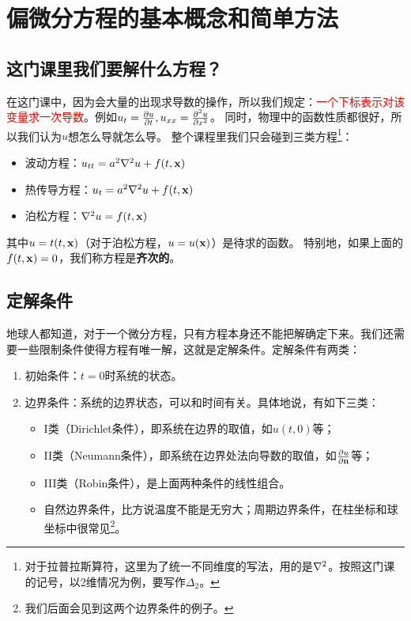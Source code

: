 \chapter{偏微分方程的基本概念和简单方法}
\section{这门课里我们要解什么方程？}
在这门课中，因为会大量的出现求导数的操作，所以我们规定：\textcolor{red}{一个下标表示对该变量求一次导数}。例如$u_t = \pdv{u}{t}, u_{xx} = \pdv[2]{u}{x}$。
同时，物理中的函数性质都很好，所以我们认为$u$想怎么导就怎么导。
整个课程里我们只会碰到三类方程\footnote{对于拉普拉斯算符，这里为了统一不同维度的写法，用的是$\laplacian{}$。按照这门课的记号，以2维情况为例，要写作$\Delta_2$。}：
\begin{itemize}
    \item 波动方程：$u_{tt} = a^2 \laplacian{u} + f(t, \vb{x})$
    \item 热传导方程：$u_{t} = a^2 \laplacian{u} + f(t, \vb{x})$
    \item 泊松方程：$\laplacian{u} = f(t, \vb{x})$
\end{itemize}
其中$u = t(t, \vb{x})$（对于泊松方程，$u = u(\vb{x})$）是待求的函数。
特别地，如果上面的$f(t, \vb{x}) = 0$，我们称方程是\textbf{齐次的}。

\section{定解条件}
地球人都知道，对于一个微分方程，只有方程本身还不能把解确定下来。我们还需要一些限制条件使得方程有唯一解，这就是定解条件。定解条件有两类：
\begin{enumerate}
    \item 初始条件：$t = 0$时系统的状态。
    \item 边界条件：系统的边界状态，可以和时间有关。具体地说，有如下三类：
        \begin{itemize}
            \item I类（Dirichlet条件），即系统在边界的取值，如$u(t, 0)$等；
            \item II类（Neumann条件），即系统在边界处法向导数的取值，如$\pdv{u}{\vb{n}}$等；
            \item III类（Robin条件），是上面两种条件的线性组合。
            \item 自然边界条件，比方说温度不能是无穷大；周期边界条件，在柱坐标和球坐标中很常见\footnote{我们后面会见到这两个边界条件的例子。}。
        \end{itemize}
\end{enumerate}

